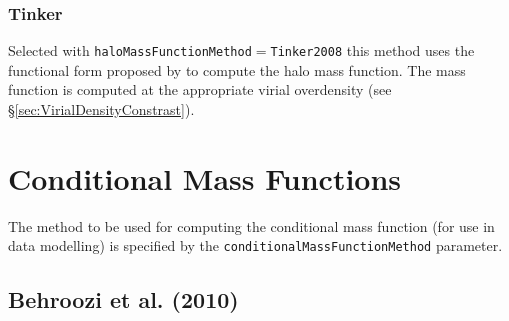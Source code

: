 \subsubsection{Tinker}

Selected with {\tt haloMassFunctionMethod}$=${\tt Tinker2008} this method uses the functional form proposed by \cite{tinker_towardhalo_2008} to compute the halo mass function. The mass function is computed at the appropriate virial overdensity (see \S\ref{sec:VirialDensityConstrast}).

\section{Conditional Mass Functions}

The method to be used for computing the conditional mass function (for use in data modelling) is specified by the {\tt conditionalMassFunctionMethod} parameter.

\subsection{Behroozi et al. (2010)}

